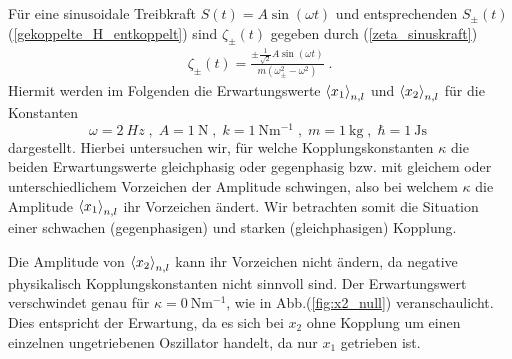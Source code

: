     Für eine sinusoidale Treibkraft $S(t)=A\sin(\omega t)$ und entsprechenden $S_\pm(t)$ (\ref{gekoppelte_H_entkoppelt}) sind $\zeta_\pm(t)$ gegeben durch (\ref{zeta_sinuskraft})
    \begin{align}
      \zeta_\pm(t) = \frac{\pm\frac{1}{\sqrt 2} A\sin(\omega t)}{m(\omega_\pm^2 - \omega^2)} \; .
    \end{align}
    Hiermit werden im Folgenden die Erwartungswerte $\braket{x_1}_{n,l}$ und $\braket{x_2}_{n,l}$ für die Konstanten
    \begin{equation}
      \omega=\SI{2}{Hz} \;,\; A=\SI{1}{\newton} \;,\; k=\SI{1}{\newton \meter^{-1}} \;,\; m=\SI{1}{\kilo \gram} \;,\; \hbar=\SI{1}{\joule \second} \;
    \end{equation}
    dargestellt.
    Hierbei untersuchen wir, für welche Kopplungskonstanten $\kappa$ die beiden Erwartungswerte gleichphasig oder gegenphasig bzw. mit gleichem oder unterschiedlichem Vorzeichen der Amplitude schwingen, also bei welchem $\kappa$ die Amplitude $\braket{x_1}_{n,l}$ ihr Vorzeichen ändert.
    Wir betrachten somit die Situation einer schwachen (gegenphasigen) und starken (gleichphasigen) Kopplung.

    Die Amplitude von $\braket{x_2}_{n,l}$ kann ihr Vorzeichen nicht ändern, da negative physikalisch Kopplungskonstanten nicht sinnvoll sind. Der Erwartungswert verschwindet genau für $\kappa=\SI{0}{\newton \meter^{-1}}$, wie in Abb.(\ref{fig:x2_null}) veranschaulicht.
    Dies entspricht der Erwartung, da es sich bei $x_2$ ohne Kopplung um einen einzelnen ungetriebenen Oszillator handelt, da nur $x_1$ getrieben ist.

